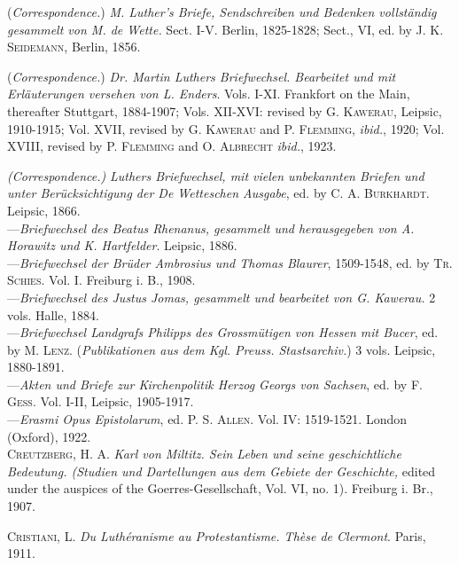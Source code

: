 (\textit{Correspondence.}) \textit{M. Luther’s Briefe, Sendschreiben und Bedenken vollständig
gesammelt von M. de Wette.} Sect. I-V. Berlin, 1825-1828; Sect.,
VI, ed. by \textsc{J. K. Seidemann}, Berlin, 1856.

(\textit{Correspondence.}) \textit{Dr. Martin Luthers Briefwechsel. Bearbeitet und mit Erläuterungen
versehen von L. Enders}. Vols. I-XI. Frankfort on the Main,
thereafter Stuttgart, 1884-1907; Vols. XII-XVI: revised by \textsc{G. Kawerau,}
Leipsic, 1910-1915; Vol. XVII, revised by \textsc{G. Kawerau} and \textsc{P. Flemming}, \textit{ibid.}, 1920; Vol. XVIII, revised by \textsc{P. Flemming} and \textsc{O. Albrecht}
\textit{ibid.}, 1923.

\textit{(Correspondence.)} \textit{Luthers Briefwechsel, mit vielen unbekannten Briefen und
unter Berücksichtigung der De Wetteschen Ausgabe}, ed. by \textsc{C. A. Burkhardt}.
Leipsic, 1866. \\
---\textit{Briefwechsel des Beatus Rhenanus, gesammelt und herausgegeben von A.
Horawitz und K. Hartfelder}. Leipsic, 1886. \\
---\textit{Briefwechsel der Brüder Ambrosius und Thomas Blaurer}, 1509-1548, ed.
by \textsc{Tr. Schies.} Vol. I. Freiburg i. B., 1908. \\
---\textit{Briefwechsel des Justus Jomas, gesammelt und bearbeitet von G. Kawerau.}
2 vols. Halle, 1884. \\
---\textit{Briefwechsel Landgrafs Philipps des Grossmütigen von Hessen mit
Bucer}, ed. by \textsc{M. Lenz.} (\textit{Publikationen aus dem Kgl. Preuss. Stastsarchiv.})
3 vols. Leipsic, 1880-1891. \\
---\textit{Akten und Briefe zur Kirchenpolitik Herzog Georgs von Sachsen}, ed.
by \textsc{F. Gess.} Vol. I-II, Leipsic, 1905-1917. \\
---\textit{Erasmi Opus Epistolarum}, ed. \textsc{P. S. Allen.} Vol. IV: 1519-1521. London
(Oxford), 1922. \\

\textsc{Creutzberg}, H. A. \textit{Karl von Miltitz. Sein Leben und seine geschichtliche
Bedeutung. (Studien und Dartellungen aus dem Gebiete der Geschichte,}
edited under the auspices of the Goerres-Gesellschaft, Vol. VI, no. 1).
Freiburg i. Br., 1907.

\textsc{Cristiani, L.} \textit{Du Luthéranisme au Protestantisme. Thèse de Clermont}. Paris,
1911.

